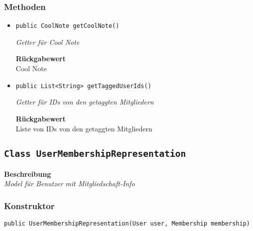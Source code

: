     \subsubsection*{Methoden}
    \begin{itemize}
    	\item{\texttt{public CoolNote getCoolNote()}}
    	
    	\textit{Getter für Cool Note}
    	
    	
    	
    	\textbf{Rückgabewert} \\
    	Cool Note        \item{\texttt{public List<String> getTaggedUserIds()}}
    	
    	\textit{Getter für IDs von den getaggten Mitgliedern}
    	
    	
    	
    	\textbf{Rückgabewert} \\
    	Liste von IDs von den getaggten Mitgliedern
    \end{itemize}
    \subsection{\texttt{Class UserMembershipRepresentation}}
    \textbf{Beschreibung} \\
    \textit{Model für Benutzer mit Mitgliedschaft-Info}
    \subsubsection*{Konstruktor}
    \texttt{public UserMembershipRepresentation(User user, Membership membership)}
